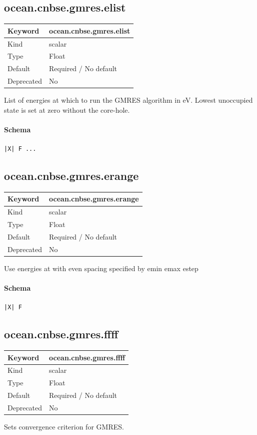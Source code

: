 \documentclass[11pt]{article}
\begin{document}
{{{{{\subsection{ocean.cnbse.gmres.elist}
\label{kw:ocean-cnbse-gmres-elist}
\begin{longtable}{|p{1.5in}|p{4.5in}|}
\hline
Keyword & ocean.cnbse.gmres.elist \\
\hline
Kind & scalar \\
\hline
Type & Float \\
\hline
Default & Required / No default \\
\hline
Deprecated & No \\
\hline
\end{longtable}
 List of energies at which to run the GMRES algorithm in eV. Lowest
 unoccupied state is set at zero without the core-hole.

\paragraph{Schema}
\begin{Verbatim}
|X| F ...
\end{Verbatim}

\subsection{ocean.cnbse.gmres.erange}
\label{kw:ocean-cnbse-gmres-erange}
\begin{longtable}{|p{1.5in}|p{4.5in}|}
\hline
Keyword & ocean.cnbse.gmres.erange \\
\hline
Kind & scalar \\
\hline
Type & Float \\
\hline
Default & Required / No default \\
\hline
Deprecated & No \\
\hline
\end{longtable}
 Use energies at with even spacing specified by
 emin emax estep

\paragraph{Schema}
\begin{Verbatim}
|X| F
\end{Verbatim}

\subsection{ocean.cnbse.gmres.ffff}
\label{kw:ocean-cnbse-gmres-ffff}
\begin{longtable}{|p{1.5in}|p{4.5in}|}
\hline
Keyword & ocean.cnbse.gmres.ffff \\
\hline
Kind & scalar \\
\hline
Type & Float \\
\hline
Default & Required / No default \\
\hline
Deprecated & No \\
\hline
\end{longtable}
 Sets convergence criterion for GMRES.

}}}}}
\end{document}
